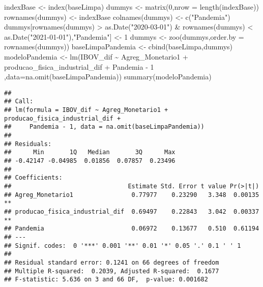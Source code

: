 \documentclass[
]{article}
\newenvironment{Shaded}{\begin{snugshade}}{\end{snugshade}}
\newcommand{\AttributeTok}[1]{\textcolor[rgb]{0.77,0.63,0.00}{#1}}
\newcommand{\DecValTok}[1]{\textcolor[rgb]{0.00,0.00,0.81}{#1}}
\newcommand{\FunctionTok}[1]{\textcolor[rgb]{0.00,0.00,0.00}{#1}}
\newcommand{\NormalTok}[1]{#1}
\newcommand{\OtherTok}[1]{\textcolor[rgb]{0.56,0.35,0.01}{#1}}
\newcommand{\SpecialCharTok}[1]{\textcolor[rgb]{0.00,0.00,0.00}{#1}}
\newcommand{\StringTok}[1]{\textcolor[rgb]{0.31,0.60,0.02}{#1}}
\begin{document}
\begin{Shaded}
\begin{Highlighting}[]
\NormalTok{indexBase }\OtherTok{\textless{}{-}} \FunctionTok{index}\NormalTok{(baseLimpa)}
\NormalTok{dummys }\OtherTok{\textless{}{-}} \FunctionTok{matrix}\NormalTok{(}\DecValTok{0}\NormalTok{,}\AttributeTok{nrow =} \FunctionTok{length}\NormalTok{(indexBase))}
\FunctionTok{rownames}\NormalTok{(dummys) }\OtherTok{\textless{}{-}}\NormalTok{ indexBase}
\FunctionTok{colnames}\NormalTok{(dummys) }\OtherTok{\textless{}{-}} \FunctionTok{c}\NormalTok{(}\StringTok{"Pandemia"}\NormalTok{)}
\NormalTok{dummys[}\FunctionTok{rownames}\NormalTok{(dummys) }\SpecialCharTok{\textgreater{}} \FunctionTok{as.Date}\NormalTok{(}\StringTok{"2020{-}03{-}01"}\NormalTok{) }\SpecialCharTok{\&} \FunctionTok{rownames}\NormalTok{(dummys) }\SpecialCharTok{\textless{}} \FunctionTok{as.Date}\NormalTok{(}\StringTok{"2021{-}01{-}01"}\NormalTok{),}\StringTok{"Pandemia"}\NormalTok{] }\OtherTok{\textless{}{-}} \DecValTok{1}
\NormalTok{dummys }\OtherTok{\textless{}{-}} \FunctionTok{zoo}\NormalTok{(dummys,}\AttributeTok{order.by =} \FunctionTok{rownames}\NormalTok{(dummys))}
\NormalTok{baseLimpaPandemia }\OtherTok{\textless{}{-}} \FunctionTok{cbind}\NormalTok{(baseLimpa,dummys)}
\NormalTok{modeloPandemia }\OtherTok{\textless{}{-}} \FunctionTok{lm}\NormalTok{(IBOV\_dif }\SpecialCharTok{\textasciitilde{}}\NormalTok{ Agreg\_Monetario1 }\SpecialCharTok{+}\NormalTok{ producao\_fisica\_industrial\_dif }\SpecialCharTok{+}\NormalTok{ Pandemia }\SpecialCharTok{{-}} \DecValTok{1}
\NormalTok{  ,}\AttributeTok{data=}\FunctionTok{na.omit}\NormalTok{(baseLimpaPandemia))}
\FunctionTok{summary}\NormalTok{(modeloPandemia)}
\end{Highlighting}
\end{Shaded}

\begin{verbatim}
## 
## Call:
## lm(formula = IBOV_dif ~ Agreg_Monetario1 + producao_fisica_industrial_dif + 
##     Pandemia - 1, data = na.omit(baseLimpaPandemia))
## 
## Residuals:
##      Min       1Q   Median       3Q      Max 
## -0.42147 -0.04985  0.01856  0.07857  0.23496 
## 
## Coefficients:
##                                Estimate Std. Error t value Pr(>|t|)   
## Agreg_Monetario1                0.77977    0.23290   3.348  0.00135 **
## producao_fisica_industrial_dif  0.69497    0.22843   3.042  0.00337 **
## Pandemia                        0.06972    0.13677   0.510  0.61194   
## ---
## Signif. codes:  0 '***' 0.001 '**' 0.01 '*' 0.05 '.' 0.1 ' ' 1
## 
## Residual standard error: 0.1241 on 66 degrees of freedom
## Multiple R-squared:  0.2039, Adjusted R-squared:  0.1677 
## F-statistic: 5.636 on 3 and 66 DF,  p-value: 0.001682
\end{verbatim}
\end{document}

